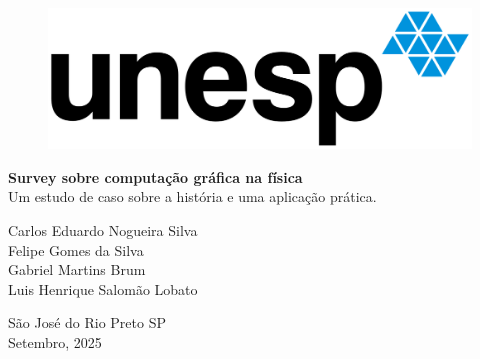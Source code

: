 \documentclass[12pt,a4paper]{article}
\begin{document}
\begin{titlepage}
	\begin{center}

\begin{figure}[H]
    \centering
    \includegraphics[width=0.5\linewidth]{img/LogoUnesp.png}
\end{figure}

	\vspace{5cm}
    \textbf{\Huge{Survey sobre computação gráfica na física}} \\
    \vspace{5pt}
    Um estudo de caso sobre a história e uma aplicação prática.
        
	\vspace{5cm}
    Carlos Eduardo Nogueira Silva \\
    Felipe Gomes da Silva \\
    Gabriel Martins Brum \\
    Luis Henrique Salomão Lobato \\
	\end{center}
	
	\vspace{1cm}
	\begin{center}
		\vspace{\fill}
    \large{São José do Rio Preto \- SP}\\
    \large{Setembro, 2025} 
	\end{center}
\end{titlepage}

\tableofcontents

\newpage

\newpage









\newpage


\end{document}
